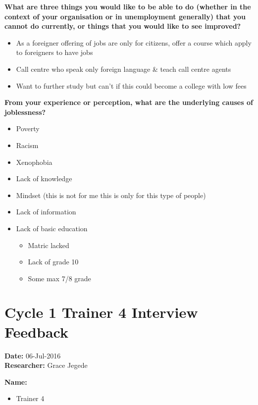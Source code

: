 \noindent\textbf{What are three things you would like to be able to do (whether in the context of your organisation or in unemployment generally) that you cannot do currently, or things that you would like to see improved?}
\begin{itemize}
\item As a foreigner offering of jobs are only for citizens, offer a course which apply to foreigners to have jobs
\item Call centre who speak only foreign language \& teach call centre agents
\item Want to further study but can’t if this could become a college with low fees
\end{itemize}

\noindent\textbf{From your experience or perception, what are the underlying causes of joblessness?}
\begin{itemize}
\item Poverty
\item Racism
\item Xenophobia
\item Lack of knowledge
\item Mindset (this is not for me this is only for this type of people)
\item Lack of information
\item Lack of basic education
\begin{itemize}
\item Matric lacked
\item Lack of grade 10
\item Some max 7/8 grade
\end{itemize}
\end{itemize}


\section{Cycle 1 Trainer 4 Interview Feedback}

\noindent\textbf{Date:} 06-Jul-2016 \\
\noindent\textbf{Researcher:} Grace Jegede



\noindent\textbf{Name:}
\begin{itemize}
\item Trainer 4
\end{itemize}

